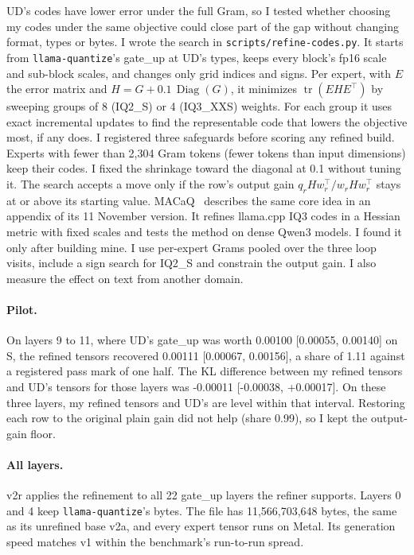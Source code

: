 \documentclass[11pt,a4paper]{article}
\newcommand{\code}[1]{\texttt{#1}}
\begin{document}
UD's codes have lower error under the full Gram, so I tested whether choosing my codes under the same objective could close part of the gap without changing format, types or bytes. I wrote the search in \code{scripts/refine-codes.py}. It starts from \code{llama-quantize}'s gate\_up at UD's types, keeps every block's fp16 scale and sub-block scales, and changes only grid indices and signs. Per expert, with $E$ the error matrix and $H = G + 0.1\,\operatorname{Diag}(G)$, it minimizes $\operatorname{tr}(E H E^\top)$ by sweeping groups of 8 (IQ2\_S) or 4 (IQ3\_XXS) weights. For each group it uses exact incremental updates to find the representable code that lowers the objective most, if any does. I registered three safeguards before scoring any refined build. Experts with fewer than 2,304 Gram tokens (fewer tokens than input dimensions) keep their codes. I fixed the shrinkage toward the diagonal at 0.1 without tuning it. The search accepts a move only if the row's output gain $q_r H w_r^\top / w_r H w_r^\top$ stays at or above its starting value. MACaQ~\citep{macaq} describes the same core idea in an appendix of its 11 November version. It refines llama.cpp IQ3 codes in a Hessian metric with fixed scales and tests the method on dense Qwen3 models. I found it only after building mine. I use per-expert Grams pooled over the three loop visits, include a sign search for IQ2\_S and constrain the output gain. I also measure the effect on text from another domain.

\paragraph{Pilot.} On layers 9 to 11, where UD's gate\_up was worth 0.00100 [0.00055, 0.00140] on S, the refined tensors recovered 0.00111 [0.00067, 0.00156], a share of 1.11 against a registered pass mark of one half. The KL difference between my refined tensors and UD's tensors for those layers was -0.00011 [-0.00038, +0.00017]. On these three layers, my refined tensors and UD's are level within that interval. Restoring each row to the original plain gain did not help (share 0.99), so I kept the output-gain floor.

\paragraph{All layers.} v2r applies the refinement to all 22 gate\_up layers the refiner supports. Layers 0 and 4 keep \code{llama-quantize}'s bytes. The file has 11,566,703,648 bytes, the same as its unrefined base v2a, and every expert tensor runs on Metal. Its generation speed matches v1 within the benchmark's run-to-run spread.
\end{document}
